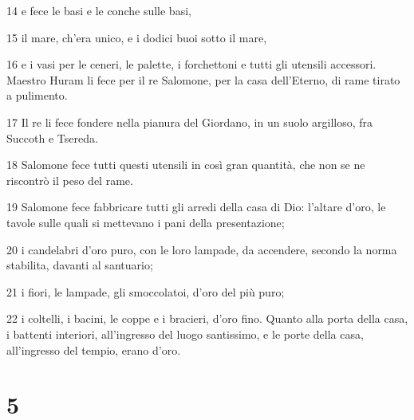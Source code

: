 \par 14 e fece le basi e le conche sulle basi,
\par 15 il mare, ch'era unico, e i dodici buoi sotto il mare,
\par 16 e i vasi per le ceneri, le palette, i forchettoni e tutti gli utensili accessori. Maestro Huram li fece per il re Salomone, per la casa dell'Eterno, di rame tirato a pulimento.
\par 17 Il re li fece fondere nella pianura del Giordano, in un suolo argilloso, fra Succoth e Tsereda.
\par 18 Salomone fece tutti questi utensili in così gran quantità, che non se ne riscontrò il peso del rame.
\par 19 Salomone fece fabbricare tutti gli arredi della casa di Dio: l'altare d'oro, le tavole sulle quali si mettevano i pani della presentazione;
\par 20 i candelabri d'oro puro, con le loro lampade, da accendere, secondo la norma stabilita, davanti al santuario;
\par 21 i fiori, le lampade, gli smoccolatoi, d'oro del più puro;
\par 22 i coltelli, i bacini, le coppe e i bracieri, d'oro fino. Quanto alla porta della casa, i battenti interiori, all'ingresso del luogo santissimo, e le porte della casa, all'ingresso del tempio, erano d'oro.

\chapter{5}

